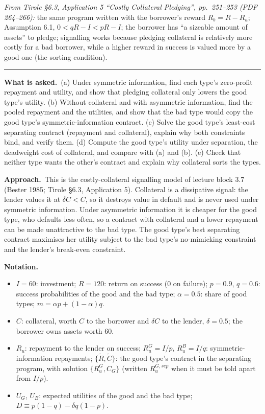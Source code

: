 \documentclass[11pt,a4paper]{article}
\newcommand{\notation}{\par\noindent\textbf{Notation.}}
\newcommand{\asked}{\par\medskip\noindent\textbf{What is asked.}~}
\newcommand{\approach}{\par\smallskip\noindent\textbf{Approach.}~}
\newcommand{\stmtend}{\par\endgroup\nopagebreak\noindent\rule{\linewidth}{0.4pt}\par\medskip}
\begin{document}
\emph{From Tirole §6.3, Application 5 ``Costly Collateral Pledging'', pp.~251--253 (PDF 264--266):}
the same program written with the borrower's reward \(R_b = R - R_u\); Assumption 6.1,
\(0 < qR - I < pR - I\); the borrower has ``a sizeable amount of assets'' to pledge; signalling
works because pledging collateral is relatively more costly for a bad borrower, while a higher
reward in success is valued more by a good one (the sorting condition).
\stmtend

\asked (a) Under symmetric information, find each type's zero-profit repayment and utility, and show that pledging collateral only lowers the good type's utility. (b) Without collateral and with asymmetric information, find the pooled repayment and the utilities, and show that the bad type would copy the good type's symmetric-information contract. (c) Solve the good type's least-cost separating contract (repayment and collateral), explain why both constraints bind, and verify them. (d) Compute the good type's utility under separation, the deadweight cost of collateral, and compare with (a) and (b). (e) Check that neither type wants the other's contract and explain why collateral sorts the types.

\approach This is the costly-collateral signalling model of lecture block 3.7 (Bester 1985; Tirole \S6.3, Application 5). Collateral is a dissipative signal: the lender values it at $\delta C<C$, so it destroys value in default and is never used under symmetric information. Under asymmetric information it is cheaper for the good type, who defaults less often, so a contract with collateral and a lower repayment can be made unattractive to the bad type. The good type's best separating contract maximises her utility subject to the bad type's no-mimicking constraint and the lender's break-even constraint.

\notation
\begin{itemize}
  \item $I=60$: investment; $R=120$: return on success (0 on failure); $p=0.9$, $q=0.6$: success probabilities of the good and the bad type; $\alpha=0.5$: share of good types; $m=\alpha p+(1-\alpha)q$.
  \item $C$: collateral, worth $C$ to the borrower and $\delta C$ to the lender, $\delta=0.5$; the borrower owns assets worth 60.
  \item $R_u$: repayment to the lender on success; $R_u^G=I/p$, $R_u^B=I/q$: symmetric-information repayments; $\{\tilde R,\tilde C\}$: the good type's contract in the separating program, with solution $\{R_u^G,C_G\}$ (written $R_u^{G,sep}$ when it must be told apart from $I/p$).
  \item $U_G$, $U_B$: expected utilities of the good and the bad type; $D\equiv p(1-q)-\delta q(1-p)$.
\end{itemize}
\end{document}
